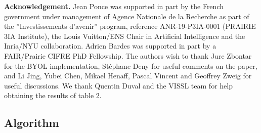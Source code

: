 \documentclass{article}
\begin{document}
\newpage

\textbf{Acknowledgement.} Jean Ponce was supported in part by the French government under management of Agence Nationale de la Recherche as part of the ”Investissements d’avenir” program,
reference ANR-19-P3IA-0001 (PRAIRIE 3IA Institute), the Louis Vuitton/ENS Chair in Artificial
Intelligence and the Inria/NYU collaboration. Adrien Bardes was supported in part by a FAIR/Prairie
CIFRE PhD Fellowship. The authors wish to thank Jure Zbontar for the BYOL implementation,
Stéphane Deny for useful comments on the paper, and Li Jing, Yubei Chen, Mikael Henaff, Pascal
Vincent and Geoffrey Zweig for useful discussions. We thank Quentin Duval and the VISSL team for
help obtaining the results of table 2.





\newpage

\renewcommand{\thesubsection}{\Alph{subsection}}
\newcommand\tab[1][5mm]{\hspace*{#1}}

\subsection{Algorithm}
\end{document}
